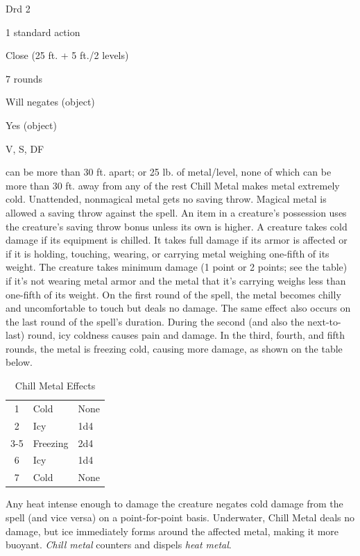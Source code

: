 
\begin{description*}
\item[Level:] Drd 2
\item[Casting Time:] 1 standard action
\item[Range:] Close (25 ft. + 5 ft./2 levels)
\item[Duration:] 7 rounds
\item[Saving Throw:] Will negates (object)
\item[Spell Resistance:] Yes (object)
\item[Components:] V, S, DF
\end{description*}

can be more than 30 ft. apart; or 25 lb. of metal/level, none of which can be more
than 30 ft. away from any of the rest
Chill Metal makes metal extremely cold. Unattended, nonmagical metal gets
no saving throw. Magical metal is allowed a saving throw against the spell. An
item in a creature's possession uses the creature's saving throw bonus unless its
own is higher.
A creature takes cold damage if its equipment is chilled. It takes full damage
if its armor is affected or if it is holding, touching, wearing, or carrying metal
weighing one-fifth of its weight. The creature takes minimum damage (1 point or
2 points; see the table) if it's not wearing metal armor and the metal that it's
carrying weighs less than one-fifth of its weight.
On the first round of the spell, the metal becomes chilly and uncomfortable to
touch but deals no damage. The same effect also occurs on the last round of the
spell's duration. During the second (and also the next-to-last) round, icy coldness
causes pain and damage. In the third, fourth, and fifth rounds, the metal is freezing
cold, causing more damage, as shown on the table below.
\begin{table}[htb]
\caption{Chill Metal Effects}
\centering
\begin{tabular}{c l l}
1 & Cold & None\\
2 & Icy & 1d4\\
3-5 & Freezing & 2d4\\
6 & Icy & 1d4\\
7 & Cold & None\\
\end{tabular}
\end{table}
Any heat intense enough to damage the creature negates cold damage from the spell
(and vice versa) on a point-for-point basis. Underwater, Chill Metal deals
no damage, but ice immediately forms around the affected metal, making it more
buoyant.
\textit{Chill metal} counters and dispels \textit{heat metal}.